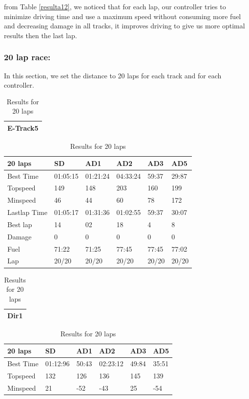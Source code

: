 \documentclass{llncs}
\begin{document}
from Table \ref{resulta12}, we noticed that for each lap, our controller tries to minimize driving time and use a maximum speed without consuming more fuel  and decreasing damage in all tracks, it improves driving to give us more optimal results then the last lap. \\

\subsubsection{ 20 lap race:}	
In this section, we set the distance to 20 laps for each track and for each controller. \\	

\begin{table} [h!] 
	
	\caption{Results for 20 laps}
	\label{resultat1}
	\begin{tabular}{ |p{15.2cm}|}
		\hline
		\textbf{E-Track5}   
		\\
		\hline
	\end{tabular}
	\begin{tabular}{ |p{3cm}|p{2cm}|p{2cm}|p{2 cm}|p{2 cm}|p{2 cm}|}
		\hline
		{ \color{blue}\textbf{20 laps} }&
		{ \color{red}\textbf{SD}}&  
		{ \color{red} \textbf{AD1} } &
		{ \color{red} \textbf{AD2} } &
		{ \color{red} \textbf{AD3} } &
		{ \color{red} \textbf{AD5} }
		\\
		\hline
		Best Time & 01:05:15  & 01:21:24  &04:33:24  & 59:37 & 29:87 
		\\
		\hline
		Topspeed & 149  & 148 & 203 & 160 & 199 
		\\
		\hline
		Minspeed & 46 & 44 & 60 & 78 & 172 
		\\
		\hline 
		
		
		Lastlap	Time  & 01:05:17 & 01:31:36 & 01:02:55 & 59:37 & 30:07
		\\
		\hline 
		Best lap & 14 & 02 & 18 &4 & 8 
		\\
		\hline
		Damage & 0 & 0 & 0 & 0 & 0 
		\\
		\hline 
		Fuel & 71:22 & 71:25 & 77:45 & 77:45 & 77:02 
		\\
		\hline 
		Lap & 20/20 & 20/20 & 20/20 & 20/20 & 20/20
		\\
		\hline
		
	\end{tabular}
	\begin{tabular}{ |p{15.2cm}|}
		\hline
		\textbf{Dir1}   
		\\
		\hline
	\end{tabular}
	\begin{tabular}{ |p{3cm}|p{2cm}|p{2cm}|p{2 cm}|p{2 cm}|p{2 cm}|}
		\hline
		{ \color{blue}\textbf{20 laps} }&
		{ \color{red}\textbf{SD}}&  
		{ \color{red} \textbf{AD1} } &
		{ \color{red} \textbf{AD2} } &
		{ \color{red} \textbf{AD3} } &
		{ \color{red} \textbf{AD5} }
		\\
		\hline
		Best Time & 01:12:96 & 50:43  &02:23:12  & 49:84 & 35:51 
		\\
		\hline
		Topspeed & 132  & 126 & 136 & 145 & 139 
		\\
		\hline
		Minspeed &  21 & -52 & -43 & 25& -54 
		\\
		\hline 
		

\end{tabular}
\end{table}
\end{document}
